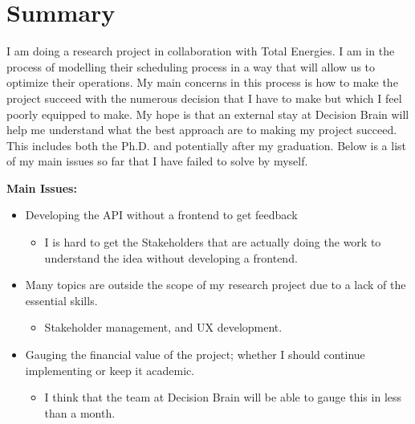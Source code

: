 \section*{Summary}
I am doing a research project in collaboration with Total Energies. I am in the process of modelling 
their scheduling process in a way that will allow us to optimize their operations. My main concerns
in this process is how to make the project succeed with the numerous decision that I have to make but 
which I feel poorly equipped to make. My hope is that an external stay at Decision Brain will help
me understand what the best approach are to making my project succeed. This includes both the Ph.D. and 
potentially after my graduation. Below is a list of my main issues so far that I have failed to solve by myself. 

\textbf{Main Issues:}
\begin{itemize}
	\item Developing the API without a frontend to get feedback 
	\begin{itemize}
		\item I is hard to get the Stakeholders that are actually doing the work to understand the idea without developing a frontend.
	\end{itemize}
	\item Many topics are outside the scope of my research project due to a lack of the essential skills. 
	\begin{itemize}
		\item Stakeholder management, and UX development.
	\end{itemize}
	\item Gauging the financial value of the project; whether I should continue implementing or keep it academic. 
	\begin{itemize}
		\item I think that the team at Decision Brain will be able to gauge this in less than a month.	
	\end{itemize}
\end{itemize}

